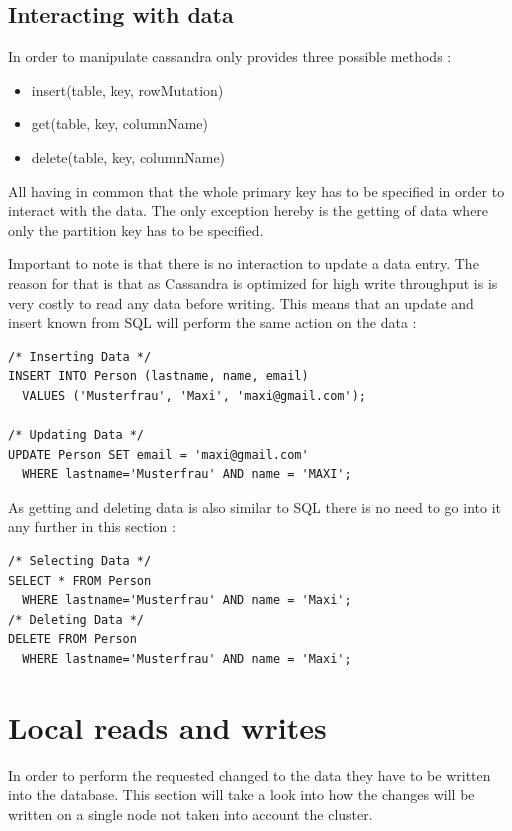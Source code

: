 \subsection{Interacting with data}
In order to manipulate cassandra only provides three possible methods \autocite{cassandra_paper}:
\begin{itemize}
    \item insert(table, key, rowMutation)
    \item get(table, key, columnName)
    \item delete(table, key, columnName)
\end{itemize}
All having in common that the whole primary key has to be specified in order to interact with the data. The only exception hereby is the getting of data where only the partition key has to be specified.

Important to note is that there is no interaction to update a data entry. The reason for that is that as Cassandra is optimized for high write throughput is is very costly to read any data before writing. This means that an update and insert known from SQL will perform the same action on the data \autocite{cqlAlexMeng, newInCQL3}:
\begin{verbatim}
/* Inserting Data */
INSERT INTO Person (lastname, name, email)
  VALUES ('Musterfrau', 'Maxi', 'maxi@gmail.com');

/* Updating Data */
UPDATE Person SET email = 'maxi@gmail.com'
  WHERE lastname='Musterfrau' AND name = 'MAXI';
\end{verbatim}

As getting and deleting data is also similar to SQL there is no need to go into it any further in this section \autocite{cqlAlexMeng, cassandra3cqldocSelect}:
\begin{verbatim}
/* Selecting Data */
SELECT * FROM Person
  WHERE lastname='Musterfrau' AND name = 'Maxi';
/* Deleting Data */
DELETE FROM Person
  WHERE lastname='Musterfrau' AND name = 'Maxi';
\end{verbatim}

\section{Local reads and writes}
In order to perform the requested changed to the data they have to be written into the database. This section will take a look into how the changes will be written on a single node not taken into account the cluster.

